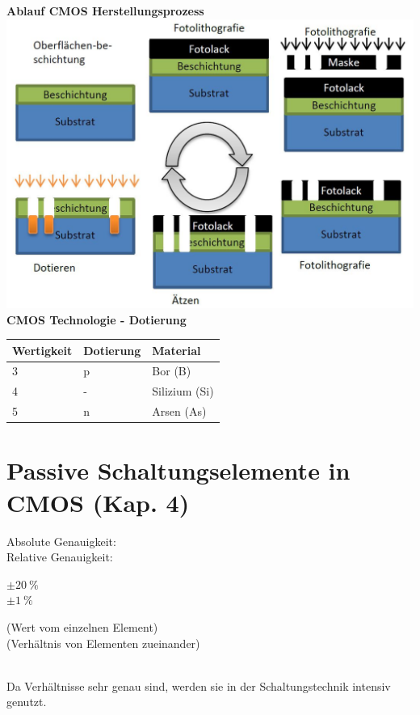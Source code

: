 \begin{minipage}[t]{0.5\textwidth}
	\textbf{Ablauf CMOS Herstellungsprozess}\\
	\includegraphics[width=1\textwidth, right]{chapters/Technologie/images/Verarbeitung}
	\textbf{CMOS Technologie - Dotierung}\\
	\begin{tabular}{|l|l|l|}
		\hline
		\textbf{Wertigkeit}&\textbf{Dotierung}&\textbf{Material}\\ \hline
		3&p&Bor (B)\\ \hline
		4&-&Silizium (Si)\\ \hline
		5&n&Arsen (As)\\ \hline
	\end{tabular}
\end{minipage}

\section{Passive Schaltungselemente in CMOS (Kap. 4)}

\begin{minipage}[c]{0.22\textwidth}
	Absolute Genauigkeit:\\Relative Genauigkeit:
\end{minipage}
\begin{minipage}[c]{0.06\textwidth}
	$\pm \SI{20}{\percent}$\\ $\pm \SI{1}{\percent}$
\end{minipage}
\begin{minipage}[c]{0.5\textwidth}
	(Wert vom einzelnen Element)\\(Verhältnis von Elementen zueinander)
\end{minipage}\\[1ex]
Da Verhältnisse sehr genau sind, werden sie in der Schaltungstechnik intensiv genutzt.

